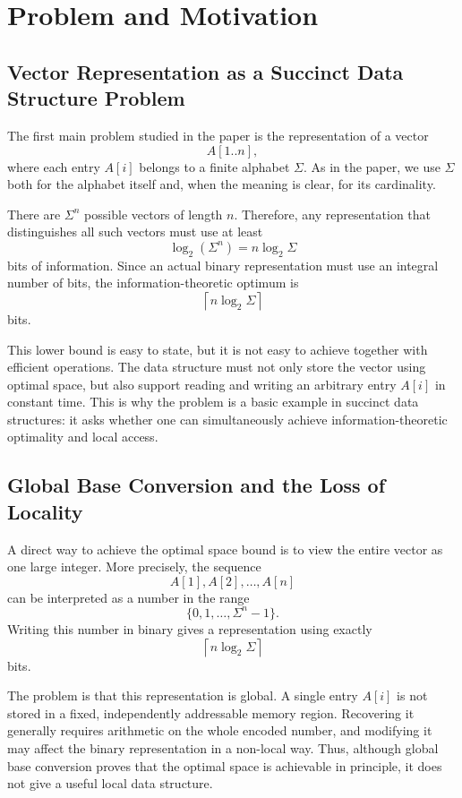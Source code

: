 \section{Problem and Motivation}

\subsection{Vector Representation as a Succinct Data Structure Problem}

The first main problem studied in the paper is the representation of a vector
\[
    A[1..n],
\]
where each entry \(A[i]\) belongs to a finite alphabet \(\Sigma\). As in the paper, we use \(\Sigma\) both for the alphabet itself and, when the meaning is clear, for its cardinality.

There are \(\Sigma^n\) possible vectors of length \(n\). Therefore, any representation that distinguishes all such vectors must use at least
\[
    \log_2(\Sigma^n)
    =
    n \log_2 \Sigma
\]
bits of information. Since an actual binary representation must use an integral number of bits, the information-theoretic optimum is
\[
    \left\lceil n \log_2 \Sigma \right\rceil
\]
bits.

This lower bound is easy to state, but it is not easy to achieve together with efficient operations. The data structure must not only store the vector using optimal space, but also support reading and writing an arbitrary entry \(A[i]\) in constant time. This is why the problem is a basic example in succinct data structures: it asks whether one can simultaneously achieve information-theoretic optimality and local access.

\subsection{Global Base Conversion and the Loss of Locality}

A direct way to achieve the optimal space bound is to view the entire vector as one large integer. More precisely, the sequence
\[
    A[1], A[2], \ldots, A[n]
\]
can be interpreted as a number in the range
\[
    \{0,1,\ldots,\Sigma^n-1\}.
\]
Writing this number in binary gives a representation using exactly
\[
    \left\lceil n \log_2 \Sigma \right\rceil
\]
bits.

The problem is that this representation is global. A single entry \(A[i]\) is not stored in a fixed, independently addressable memory region. Recovering it generally requires arithmetic on the whole encoded number, and modifying it may affect the binary representation in a non-local way. Thus, although global base conversion proves that the optimal space is achievable in principle, it does not give a useful local data structure.

